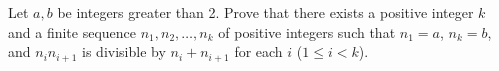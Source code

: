Let $a,b$ be integers greater than 2. Prove that there exists a positive integer $k$ and a finite sequence $n_1, n_2, \dots, n_k$ of positive integers such that $n_1 = a$,  $n_k = b$,  and $n_i n_{i+1}$ is divisible by $n_i + n_{i+1}$ for each $i$ ($1 \leq i < k$).